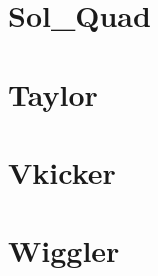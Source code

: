\section{Sol\_Quad}
\label{s:sq}

\section{Taylor}
\label{s:tay}

\section{Vkicker}
\label{s:vk}

\section{Wiggler} 
\label{s:wig}

